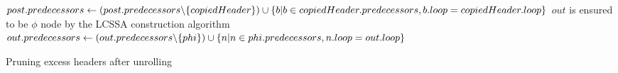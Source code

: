 \begin{algorithm}
    \begin{algorithmic}
                \State {}
            \EndFor
                \State $post.predecessors \gets (post.predecessors \backslash \{copiedHeader\}) \cup \newline \{b \vert  b \in copiedHeader.predecessors, b.loop = copiedHeader.loop\}$
            \EndFor
        \EndFunction
                \Comment $out$ is ensured to be $\phi$ node by the LCSSA construction algorithm~\cite{aebi18bachelorarbeit}
                    \State $out.predecessors \gets (out.predecessors \backslash \{phi\}) \cup \newline \{n \vert  n \in phi.predecessors, n.loop = out.loop\}$
                \EndIf
            \EndFor
        \EndFunction
    \end{algorithmic}
    \caption{Pruning excess headers after unrolling}
    \label{alg:impl:unroll:prune-headers}
\end{algorithm}